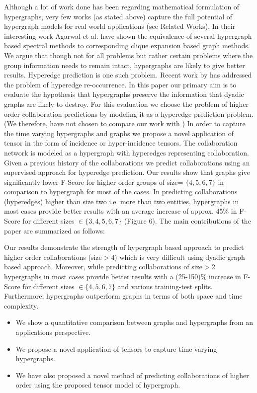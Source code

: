 \documentclass{sig-alternate}
\begin{document}

Although a lot of work done has been regarding mathematical formulation of hypergraphs, very few works (as stated above) capture the full potential of hypergraph models for real world applications (see Related Works). In their interesting work Agarwal et al.\cite{agarwal2008} have shown the equivalence of several hypergraph based spectral methods to corresponding clique expansion based graph methods. We argue that though not for all problems but rather certain problems where the group information needs to remain intact, hypergraphs are likely to give better results. Hyperedge prediction is one such problem. Recent work by \cite{latent2013} has addressed the problem of hyperedge re-occurrence. In this paper our primary aim is to evaluate the hypothesis that hypergraphs preserve the information that dyadic graphs are likely to destroy. For this evaluation we choose the problem of higher order collaboration predictions by modeling it as a hyperedge prediction problem. (We therefore, have not chosen to compare our work with \cite{latent2013}) In order to capture the time varying hypergraphs and graphs we propose a novel application of tensor in the form of incidence or hyper-incidence tensors. The collaboration network is modeled as a hypergraph with hyperedges representing collaboration. Given a previous history of the collaborations we predict collaborations using an supervised approach for hyperedge prediction. Our results show that graphs give significantly lower F-Score for higher order groups of size= $\{4,5,6,7\}$ in comparison to hypergraph for most of the cases. In predicting collaborations (hyperedges) higher than size two i.e. more than two entities, hypergraphs in most cases provide better results with an average increase of approx. 45\% in F-Score for different sizes $\in \{3,4,5,6,7\}$ (Figure 6). The main contributions of the paper are summarized as follows:

Our results demonstrate the strength of hypergraph based approach to predict higher order collaborations (size$>$4) which is very difficult using dyadic graph based approach. Moreover, while predicting collaborations of size$>$2 hypergraphs in most cases provide better results with a (25-150)\% increase in F-Score for different sizes $\in \{4,5,6,7\}$  and various training-test splits. Furthermore, hypergraphs outperform graphs in terms of both space and time complexity. 

\begin{itemize}

\item We show a quantitative comparison between graphs and hypergraphs from an applications perspective. 

\item We propose a novel application of tensors to capture time varying  hypergraphs. 

\item We have also proposed a novel method of predicting collaborations of higher order using the proposed tensor model of hypergraph. 

\end{itemize} 
\end{document}
